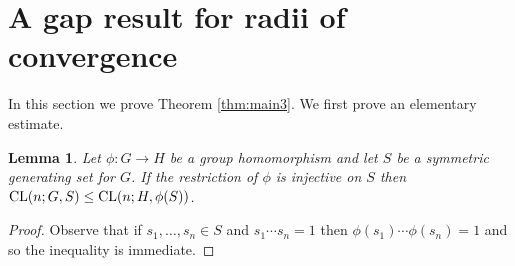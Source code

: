 \documentclass[11pt]{amsart}
\newtheorem{lemma}[theorem]{Lemma}
\theoremstyle{definition}
\begin{document}
\section{A gap result for radii of convergence}
\label{sec:gap}
In this section we prove Theorem \ref{thm:main3}.  We first prove an elementary estimate.
\begin{lemma}
  Let $\phi: G\to H$ be a group homomorphism and let $S$ be a
  symmetric generating set for $G$.  If the restriction of $\phi$ is
  injective on $S$ then ${\rm CL}(n;G,S)\le {\rm CL}(n;H,\phi(S))$.
\end{lemma}
\begin{proof}
Observe that if $s_1,\ldots, s_n\in S$ and $s_1\cdots s_n=1$ then $\phi(s_1)\cdots \phi(s_n)=1$ and so the inequality is immediate.
\end{proof}
\end{document}
